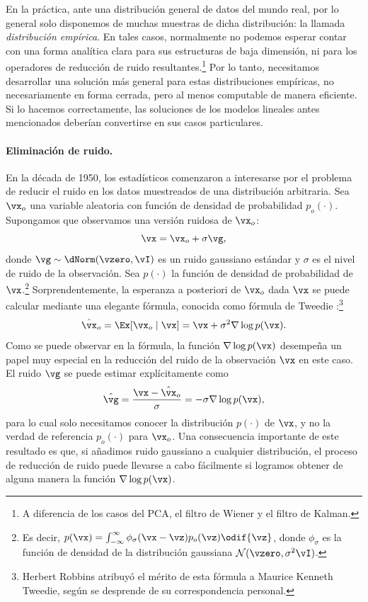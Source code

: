 \documentclass[../../book-main_es.tex]{subfiles}
\begin{document}
En la práctica, ante una distribución general de datos del mundo real,
por lo general solo disponemos de muchas muestras de dicha distribución: la
llamada \textit{distribución empírica}. En tales casos, normalmente
no podemos esperar contar con una forma analítica clara para sus
estructuras de baja dimensión, ni para los operadores de reducción de ruido
resultantes.\footnote{A diferencia de los casos del PCA, el filtro de Wiener
y el filtro de Kalman.} Por lo tanto, necesitamos desarrollar una solución más general
para estas distribuciones empíricas, no necesariamente en forma cerrada,
pero al menos computable de manera eficiente. Si lo hacemos correctamente,
las soluciones de los modelos lineales antes mencionados deberían convertirse en sus 
casos particulares.

\paragraph{Eliminación de ruido.} En la década de 1950, los estadísticos comenzaron 
a interesarse por el problema de reducir el ruido en los datos muestreados de una 
distribución arbitraria. Sea \(\vx_{o}\) una variable aleatoria con función de densidad de probabilidad
\(p_{o}(\cdot)\). Supongamos que observamos una versión ruidosa de \(\vx_{o}\):
\begin{equation}
    \vx = \vx_{o} + \sigma \vg,
\end{equation}
donde \(\vg \sim \dNorm(\vzero, \vI)\) es un ruido gaussiano estándar y
\(\sigma\) es el nivel de ruido de la observación. Sea \(p(\cdot)\)
la función de densidad de probabilidad de \(\vx\).\footnote{Es decir,
    \(p(\vx) = \int_{-\infty}^{\infty} \phi_{\sigma}(\vx - \vz)p_{o}(\vz)
    \odif{\vz}\), donde \(\phi_{\sigma}\) es la función de densidad de la
distribución gaussiana \(\mathcal{N}(\vzero, \sigma^{2} \vI)\).}
Sorprendentemente, la esperanza a posteriori de \(\vx_{o}\) dada \(\vx\) 
se puede calcular mediante una elegante fórmula, conocida como fórmula de Tweedie
\cite{Robbins1956AnEB}:\footnote{Herbert Robbins atribuyó el mérito de
esta fórmula a Maurice Kenneth Tweedie, según se desprende de su correspondencia personal.}
\begin{equation}
    \hat{\vx}_{o} = \Ex[\vx_{o}\mid \vx] = \vx + \sigma^{2} \nabla \log p(\vx).
\end{equation}
Como se puede observar en la fórmula, la función \(\nabla \log p(\vx)\)
desempeña un papel muy especial en la reducción del ruido de la observación \(\vx\) en este caso.
El ruido \(\vg\) se puede estimar explícitamente como
\begin{equation}
    \hat{\vg} = \frac{\vx - \hat{\vx}_{o}}{\sigma} = -\sigma \nabla \log p(\vx),
\end{equation}
para lo cual solo necesitamos conocer la distribución \(p(\cdot)\) de
\(\vx\), y no la verdad de referencia \(p_{o}(\cdot)\) para \(\vx_{o}\). Una
consecuencia importante de este resultado es que, si añadimos ruido gaussiano
a cualquier distribución, el proceso de reducción de ruido puede llevarse a cabo fácilmente si
logramos obtener de alguna manera la función \(\nabla \log p(\vx)\).
\end{document}
